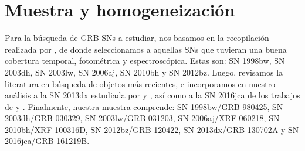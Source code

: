 \documentclass[baaa]{baaa}
\begin{document}



\section{Muestra y homogeneización}\label{sec:muestra}



Para la búsqueda de GRB-SNs a estudiar, nos basamos en la recopilaci\'on realizada por \cite{Cano:2017}, de donde seleccionamos a  aquellas SNs que tuvieran una buena cobertura temporal, fotom\'etrica y espectrosc\'opica. Estas son: SN 1998bw, SN 2003dh, SN 2003lw, SN 2006aj, SN 2010bh y SN 2012bz. Luego, revisamos la literatura en búsqueda de objetos más recientes, e incorporamos en nuestro análisis a la SN 2013dx estudiada por \cite{Taddia:2019} y \cite{DElia:2015}, as\'i como a la SN 2016jca de los trabajos de \cite{Cano:2017b} y \cite{Ashal:2019}. Finalmente, nuestra muestra comprende: SN 1998bw/GRB 980425, SN 2003dh/GRB 030329, SN 2003lw/GRB 031203, SN 2006aj/XRF 060218, SN 2010bh/XRF 100316D, SN 2012bz/GRB 120422, SN 2013dx/GRB 130702A y SN 2016jca/GRB 161219B.
\end{document}
